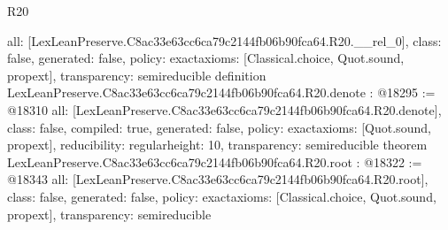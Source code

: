 \begin{lexlean}{R20}
\begin{coremodule}
{  all: [LexLeanPreserve.C8ac33e63cc6ca79c2144fb06b90fca64.R20.__rel_0],
  class: false,
  generated: false,
  policy: exact{axioms: [Classical.choice, Quot.sound, propext]},
  transparency: semireducible
}
definition LexLeanPreserve.C8ac33e63cc6ca79c2144fb06b90fca64.R20.denote : @18295 := @18310 {
  all: [LexLeanPreserve.C8ac33e63cc6ca79c2144fb06b90fca64.R20.denote],
  class: false,
  compiled: true,
  generated: false,
  policy: exact{axioms: [Quot.sound, propext]},
  reducibility: regular{height: 10},
  transparency: semireducible
}
theorem LexLeanPreserve.C8ac33e63cc6ca79c2144fb06b90fca64.R20.root : @18322 := @18343 {
  all: [LexLeanPreserve.C8ac33e63cc6ca79c2144fb06b90fca64.R20.root],
  class: false,
  generated: false,
  policy: exact{axioms: [Classical.choice, Quot.sound, propext]},
  transparency: semireducible
}


\end{coremodule}
\end{lexlean}
